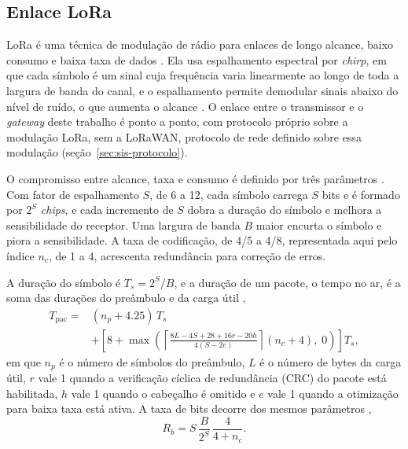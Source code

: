 \begin{quadro}[!htb]
\begin{tabular}
\bottomrule
\end{tabular}
\end{quadro}

\subsection{Enlace LoRa}\label{sec:fund-lora}

LoRa é uma técnica de modulação de rádio para enlaces de longo alcance, baixo consumo e baixa taxa de dados \cite{augustin2016}. Ela usa espalhamento espectral por \textit{chirp}, em que cada símbolo é um sinal cuja frequência varia linearmente ao longo de toda a largura de banda do canal, e o espalhamento permite demodular sinais abaixo do nível de ruído, o que aumenta o alcance \cite{augustin2016}. O enlace entre o transmissor e o \textit{gateway} deste trabalho é ponto a ponto, com protocolo próprio sobre a modulação LoRa, sem a LoRaWAN, protocolo de rede definido sobre essa modulação (seção~\ref{sec:sis-protocolo}).

O compromisso entre alcance, taxa e consumo é definido por três parâmetros \cite{semtech2015}. Com fator de espalhamento $S$, de 6 a 12, cada símbolo carrega $S$ bits e é formado por $2^S$ \textit{chips}, e cada incremento de $S$ dobra a duração do símbolo e melhora a sensibilidade do receptor. Uma largura de banda $B$ maior encurta o símbolo e piora a sensibilidade. A taxa de codificação, de 4/5 a 4/8, representada aqui pelo índice $n_c$, de 1 a 4, acrescenta redundância para correção de erros.

A duração do símbolo é $T_s = 2^S/B$, e a duração de um pacote, o tempo no ar, é a soma das durações do preâmbulo e da carga útil \cite{semtech2015},
\begin{equation}
\begin{split}
T_{\mathrm{pac}} = {} & (n_p + \num{4,25})\,T_s \\
& + \left[ 8 + \max\!\left( \left\lceil \frac{8L - 4S + 28 + 16r - 20h}{4(S - 2e)} \right\rceil (n_c + 4),\; 0 \right) \right] T_s,
\end{split}
\label{eq:fund-toa}
\end{equation}
em que $n_p$ é o número de símbolos do preâmbulo, $L$ é o número de bytes da carga útil, $r$ vale 1 quando a verificação cíclica de redundância (CRC) do pacote está habilitada, $h$ vale 1 quando o cabeçalho é omitido e $e$ vale 1 quando a otimização para baixa taxa está ativa. A taxa de bits decorre dos mesmos parâmetros \cite{semtech2015},
\begin{equation}
R_b = S\,\frac{B}{2^S}\,\frac{4}{4 + n_c}.
\label{eq:fund-taxa}
\end{equation}

